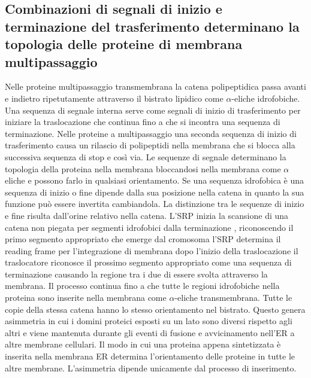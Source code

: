 \subsection{Combinazioni di segnali di inizio e terminazione del trasferimento determinano la topologia delle proteine di membrana multipassaggio}
Nelle proteine multipassaggio transmembrana la catena polipeptidica passa avanti e indietro ripetutamente attraverso il bistrato lipidico come $\alpha$-eliche idrofobiche. Una sequenza
di segnale interna serve come segnali di inizio di trasferimento per iniziare la traslocazione che continua fino a che si incontra una sequenza di terminazione. Nelle proteine a 
multipassaggio una seconda sequenza di inizio di trasferimento causa un rilascio di polipeptidi nella membrana che si blocca alla successiva sequenza di stop e cos\`i via. Le sequenze
di segnale determinano la topologia della proteina nella membrana bloccandosi nella membrana come $\alpha$ eliche e possono farlo in qualsiasi orientamento. Se una sequenza idrofobica
\`e una sequenza di inizio o fine dipende dalla sua posizione nella catena in quanto la sua funzione pu\`o essere invertita cambiandola. La distinzione tra le sequenze di inizio e fine
risulta dall'orine relativo nella catena. L'SRP inizia la scansione di una catena non piegata per segmenti idrofobici dalla terminazione , riconoscendo il primo segmento 
appropriato che emerge dal cromosoma l'SRP determina il reading frame per l'integrazione di membrana dopo l'inizio della traslocazione il traslocatore riconosce il prossimo segmento
appropriato come una sequenza di terminazione causando la regione tra i due di essere svolta attraverso la membrana. Il processo continua fino a che tutte le regioni idrofobiche nella
proteina sono inserite nella membrana come $\alpha$-eliche transmembrana. Tutte le copie della stessa catena hanno lo stesso orientamento nel bistrato. Questo genera asimmetria in cui
i domini proteici esposti su un lato sono diversi rispetto agli altri e viene mantenuta durante gli eventi di fusione e avvicinamento nell'ER a altre membrane cellulari. Il modo in 
cui una proteina appena sintetizzata \`e inserita nella membrana ER determina l'orientamento delle proteine in tutte le altre membrane. L'asimmetria dipende unicamente dal processo di
inserimento.

